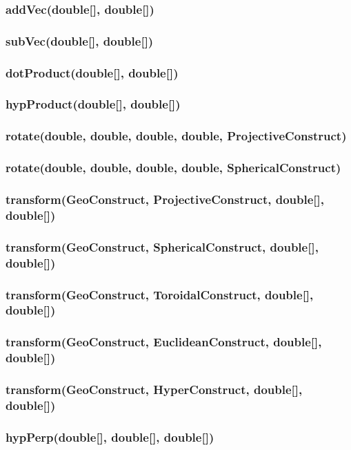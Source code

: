 \documentclass[a4paper,10pt]{report}
\begin{document}
\subsubsection{addVec(double[], double[])}
\subsubsection{subVec(double[], double[])}
\subsubsection{dotProduct(double[], double[])}
\subsubsection{hypProduct(double[], double[])}
\subsubsection{rotate(double, double, double, double, ProjectiveConstruct)}
\subsubsection{rotate(double, double, double, double, SphericalConstruct)}
\subsubsection{transform(GeoConstruct, ProjectiveConstruct, double[], double[])}
\subsubsection{transform(GeoConstruct, SphericalConstruct, double[], double[])}
\subsubsection{transform(GeoConstruct, ToroidalConstruct, double[], double[])}
\subsubsection{transform(GeoConstruct, EuclideanConstruct, double[], double[])}
\subsubsection{transform(GeoConstruct, HyperConstruct, double[], double[])}
\subsubsection{hypPerp(double[], double[], double[])}
\end{document}
